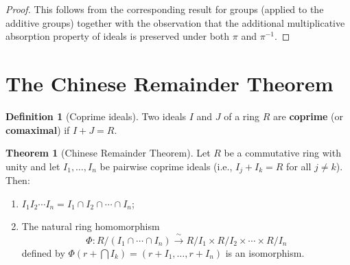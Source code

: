 \documentclass[12pt,a4paper,openany]{book}
\theoremstyle{definition}
\newtheorem{definition}{Definition}[chapter]
\newtheorem{theorem}{Theorem}[chapter]
\theoremstyle{remark}
\begin{document}
\begin{proof}
This follows from the corresponding result for groups (applied to the additive groups) together with the observation that the additional multiplicative absorption property of ideals is preserved under both $\pi$ and $\pi^{-1}$.
\end{proof}

\section{The Chinese Remainder Theorem}\label{sec:CRT}

\begin{definition}[Coprime ideals]\label{def:coprime-ideals}
Two ideals $I$ and $J$ of a ring $R$ are \textbf{coprime} (or \textbf{comaximal}) if $I+J=R$.
\end{definition}

\begin{theorem}[Chinese Remainder Theorem]\label{thm:CRT}
Let $R$ be a commutative ring with unity and let $I_1,\ldots,I_n$ be pairwise coprime ideals (i.e., $I_j+I_k=R$ for all $j\neq k$). Then:
\begin{enumerate}[label=(\roman*)]
    \item $I_1I_2\cdots I_n = I_1\cap I_2\cap\cdots\cap I_n$;
    \item The natural ring homomorphism
    \[
        \Phi\colon R/(I_1\cap\cdots\cap I_n) \xrightarrow{\;\sim\;} R/I_1\times R/I_2\times\cdots\times R/I_n
    \]
    defined by $\Phi(r+\bigcap I_k) = (r+I_1,\ldots,r+I_n)$ is an isomorphism.
\end{enumerate}
\end{theorem}
\end{document}
